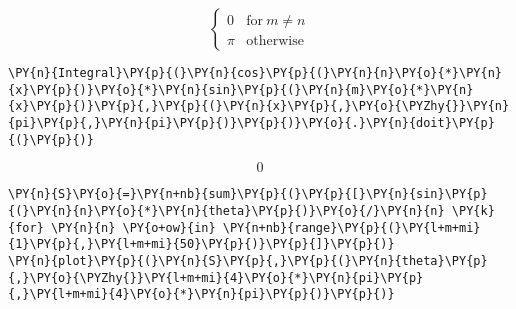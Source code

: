             
    
    $$\begin{cases} 0 & \text{for}\: m \neq n \\\pi & \text{otherwise} \end{cases}$$

    

    \begin{tcolorbox}[breakable, size=fbox, boxrule=1pt, pad at break*=1mm,colback=cellbackground, colframe=cellborder]
\begin{Verbatim}[commandchars=\\\{\}]
\PY{n}{Integral}\PY{p}{(}\PY{n}{cos}\PY{p}{(}\PY{n}{n}\PY{o}{*}\PY{n}{x}\PY{p}{)}\PY{o}{*}\PY{n}{sin}\PY{p}{(}\PY{n}{m}\PY{o}{*}\PY{n}{x}\PY{p}{)}\PY{p}{,}\PY{p}{(}\PY{n}{x}\PY{p}{,}\PY{o}{\PYZhy{}}\PY{n}{pi}\PY{p}{,}\PY{n}{pi}\PY{p}{)}\PY{p}{)}\PY{o}{.}\PY{n}{doit}\PY{p}{(}\PY{p}{)}
\end{Verbatim}
\end{tcolorbox}
 
            
    
    $$0$$

    

    \begin{tcolorbox}[breakable, size=fbox, boxrule=1pt, pad at break*=1mm,colback=cellbackground, colframe=cellborder]
\begin{Verbatim}[commandchars=\\\{\}]
\PY{n}{S}\PY{o}{=}\PY{n+nb}{sum}\PY{p}{(}\PY{p}{[}\PY{n}{sin}\PY{p}{(}\PY{n}{n}\PY{o}{*}\PY{n}{theta}\PY{p}{)}\PY{o}{/}\PY{n}{n} \PY{k}{for} \PY{n}{n} \PY{o+ow}{in} \PY{n+nb}{range}\PY{p}{(}\PY{l+m+mi}{1}\PY{p}{,}\PY{l+m+mi}{50}\PY{p}{)}\PY{p}{]}\PY{p}{)}
\PY{n}{plot}\PY{p}{(}\PY{n}{S}\PY{p}{,}\PY{p}{(}\PY{n}{theta}\PY{p}{,}\PY{o}{\PYZhy{}}\PY{l+m+mi}{4}\PY{o}{*}\PY{n}{pi}\PY{p}{,}\PY{l+m+mi}{4}\PY{o}{*}\PY{n}{pi}\PY{p}{)}\PY{p}{)}
\end{Verbatim}
\end{tcolorbox}

    \begin{center}
    \end{center}
    { \hspace*{\fill} \\}
    
